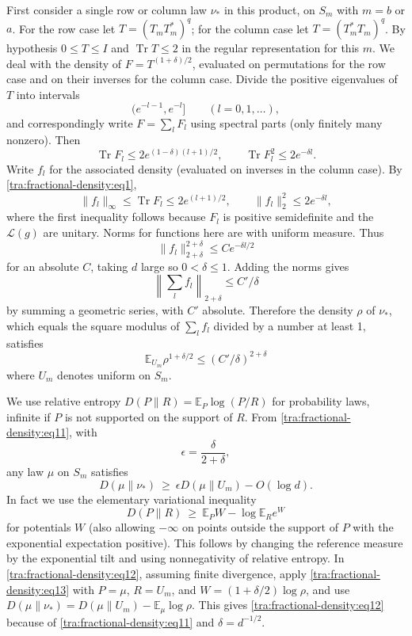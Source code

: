 \label{tra:fractional-density:fractional-spectral-density}
First consider a single row or column law \(\nu_*\) in this product, on \(S_m\) with \(m=b\) or \(a\). For the row case let \(T=(T_m T_m^*)^q\); for the column case let \(T=(T_m^* T_m)^q\). By hypothesis \(0\le T\le I\) and \(\operatorname{Tr} T\le 2\) in the regular representation for this \(m\). We deal with the density of \(F=T^{(1+\delta)/2}\), evaluated on permutations for the row case and on their inverses for the column case. Divide the positive eigenvalues of \(T\) into intervals
\[
 (e^{-l-1},e^{-l}]\qquad (l=0,1,\ldots),
\]
and correspondingly write \(F=\sum_l F_l\) using spectral parts (only finitely many nonzero). Then
\[
 \operatorname{Tr} F_l\le 2 e^{(1-\delta)(l+1)/2},
 \qquad
 \operatorname{Tr} F_l^2\le 2 e^{-\delta l}.
\]
Write \(f_l\) for the associated density (evaluated on inverses in the column case). By \eqref{tra:fractional-density:eq1},
\[
 \|f_l\|_\infty\le \operatorname{Tr} F_l\le 2e^{(l+1)/2},\qquad
 \|f_l\|_2^2\le 2e^{-\delta l},
\]
where the first inequality follows because \(F_l\) is positive semidefinite and the \(\mathcal L(g)\) are unitary. Norms for functions here are with uniform measure. Thus
\[
 \|f_l\|_{2+\delta}^{2+\delta}
 \le C e^{-\delta l/2}
\]
for an absolute \(C\), taking \(d\) large so \(0<\delta\le 1\). Adding the norms gives
\[
 \left\|\sum_l f_l\right\|_{2+\delta}\le C'/\delta
\]
by summing a geometric series, with \(C'\) absolute. Therefore the density \(\rho\) of \(\nu_*\), which equals the square modulus of \(\sum_l f_l\) divided by a number at least 1, satisfies
\begin{equation}
 \mathbb E_{U_m}\rho^{1+\delta/2}\le (C'/\delta)^{2+\delta}
 \label{tra:fractional-density:eq11}
\end{equation}
where \(U_m\) denotes uniform on \(S_m\).

\label{tra:fractional-density:density-relative-entropy-comparison}
We use relative entropy \(D(P\|R)=\mathbb E_P\log(P/R)\) for probability laws, infinite if \(P\) is not supported on the support of \(R\). From \eqref{tra:fractional-density:eq11}, with
\[
 \epsilon=\frac{\delta}{2+\delta},
\]
any law \(\mu\) on \(S_m\) satisfies
\begin{equation}
 D(\mu\|\nu_*)\ \ge\ \epsilon D(\mu\|U_m)-O(\log d).
 \label{tra:fractional-density:eq12}
\end{equation}
In fact we use the elementary variational inequality
\begin{equation}
 D(P\|R)\ \ge\ \mathbb E_P W-\log \mathbb E_R e^W
 \label{tra:fractional-density:eq13}
\end{equation}
for potentials \(W\) (also allowing \(-\infty\) on points outside the support of \(P\) with the exponential expectation positive). This follows by changing the reference measure by the exponential tilt and using nonnegativity of relative entropy. In \eqref{tra:fractional-density:eq12}, assuming finite divergence, apply \eqref{tra:fractional-density:eq13} with \(P=\mu\), \(R=U_m\), and \(W=(1+\delta/2)\log\rho\), and use \(D(\mu\|\nu_*)=D(\mu\|U_m)-\mathbb E_\mu\log\rho\). This gives \eqref{tra:fractional-density:eq12} because of \eqref{tra:fractional-density:eq11} and \(\delta=d^{-1/2}\).

